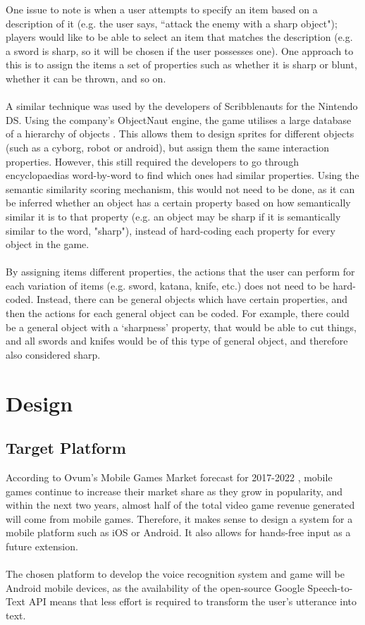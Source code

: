 \documentclass[11pt]{article}
\begin{document}
One issue to note is when a user attempts to specify an item based on a description of it (e.g. the user says, ``attack the enemy with a sharp object"); players would like to be able to select an item that matches the description (e.g. a sword is sharp, so it will be chosen if the user possesses one). One approach to this is to assign the items a set of properties such as whether it is sharp or blunt, whether it can be thrown, and so on.
\\
\\
A similar technique was used by the developers of Scribblenauts for the Nintendo DS. Using the company's ObjectNaut engine, the game utilises a large database of a hierarchy of objects \cite{RefWorks:48}. This allows them to design sprites for different objects (such as a cyborg, robot or android), but assign them the same interaction properties. However, this still required the developers to go through encyclopaedias word-by-word to find which ones had similar properties. Using the semantic similarity scoring mechanism, this would not need to be done, as it can be inferred whether an object has a certain property based on how semantically similar it is to that property (e.g. an object may be sharp if it is semantically similar to the word, "sharp"), instead of hard-coding each property for every object in the game.
\\
\\
By assigning items different properties, the actions that the user can perform for each variation of items (e.g. sword, katana, knife, etc.) does not need to be hard-coded. Instead, there can be general objects which have certain properties, and then the actions for each general object can be coded. For example, there could be a general object with a `sharpness' property, that would be able to cut things, and all swords and knifes would be of this type of general object, and therefore also considered sharp.
\newpage

\section{Design}
\subsection{Target Platform}

According to Ovum's Mobile Games Market forecast for 2017-2022 \cite{RefWorks:109}, mobile games continue to increase their market share as they grow in popularity, and within the next two years, almost half of the total video game revenue generated will come from mobile games. Therefore, it makes sense to design a system for a mobile platform such as iOS or Android.  It also allows for hands-free input as a future extension.
\\
\\
The chosen platform to develop the voice recognition system and game will be Android mobile devices, as the availability of the open-source Google Speech-to-Text API means that less effort is required to transform the user's utterance into text.
\end{document}
